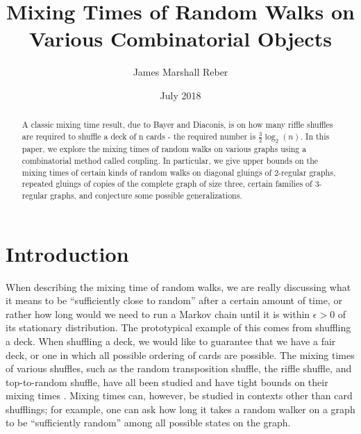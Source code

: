 \documentclass[10pt,a4paper]{amsart}
\author{James Marshall Reber}
\title{Mixing Times of Random Walks on Various Combinatorial Objects}
\date{July 2018}
\theoremstyle{definition}
\numberwithin{definition}{section}
\begin{document}
\begin{abstract}
   A classic mixing time result, due to Bayer and Diaconis, is on how many riffle shuffles are required to shuffle a deck of n cards - the required number is $\frac{3}{2} \log_2(n)$. In this paper, we explore the mixing times of random walks on various graphs using a combinatorial method called coupling. In particular, we give upper bounds on the mixing times of certain kinds of random walks on diagonal gluings of $2$-regular graphs, repeated gluings of copies of the complete graph of size three, certain families of $3$-regular graphs, and conjecture some possible generalizations.
\end{abstract}
\maketitle


\tableofcontents

\section{Introduction} \label{sec:intro} 
When describing the mixing time of random walks, we are really discussing what it means to be ``sufficiently close to random'' after a certain amount of time, or rather how long would we need to run a Markov chain until it is within $\epsilon > 0$ of its stationary distribution. The prototypical example of this comes from shuffling a deck. When shuffling a deck, we would like to guarantee that we have a fair deck, or one in which all possible ordering of cards are possible. The mixing times of various shuffles, such as the random transposition shuffle, the riffle shuffle, and top-to-random shuffle, have all been studied and have tight bounds on their mixing times \cite{aldous1986shuffling}. Mixing times can, however, be studied in contexts other than card shufflings; for example, one can ask how long it takes a random walker on a graph to be ``sufficiently random'' among all possible states on the graph.
\end{document}
